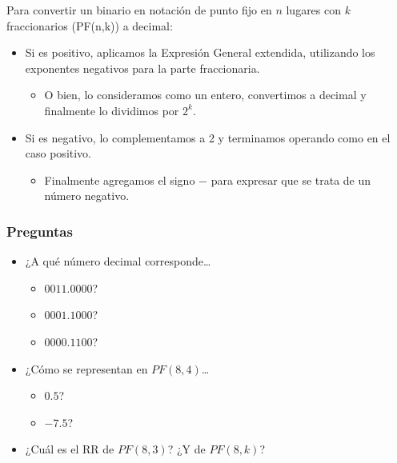 \documentclass[spanish,a4paper,]{article}
\providecommand{\tightlist}{%
  \setlength{\itemsep}{0pt}\setlength{\parskip}{0pt}}
\begin{document}
Para convertir un binario en notación de punto fijo en \(n\) lugares con
\(k\) fraccionarios (PF(n,k)) a decimal:

\begin{itemize}
\tightlist
\item
  Si es positivo, aplicamos la Expresión General extendida, utilizando
  los exponentes negativos para la parte fraccionaria.

  \begin{itemize}
  \tightlist
  \item
    O bien, lo consideramos como un entero, convertimos a decimal y
    finalmente lo dividimos por \(2^k\).
  \end{itemize}
\item
  Si es negativo, lo complementamos a 2 y terminamos operando como en el
  caso positivo.

  \begin{itemize}
  \tightlist
  \item
    Finalmente agregamos el signo \(-\) para expresar que se trata de un
    número negativo.
  \end{itemize}
\end{itemize}

\hypertarget{preguntas}{%
\subsubsection{Preguntas}\label{preguntas}}

\begin{itemize}
\tightlist
\item
  ¿A qué número decimal corresponde\ldots{}

  \begin{itemize}
  \tightlist
  \item
    \(0011.0000\)?
  \item
    \(0001.1000\)?
  \item
    \(0000.1100\)?
  \end{itemize}
\item
  ¿Cómo se representan en \(PF(8,4)\)\ldots{}

  \begin{itemize}
  \tightlist
  \item
    \(0.5\)?
  \item
    \(-7.5\)?
  \end{itemize}
\item
  ¿Cuál es el RR de \(PF(8,3)\)? ¿Y de \(PF(8,k)\)?
\end{itemize}
\end{document}
